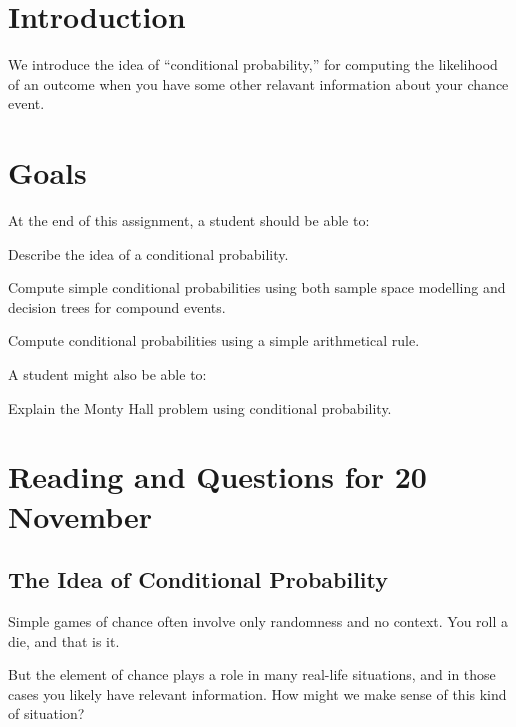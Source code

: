 \documentclass[12pt,letterpaper]{article}
\theoremstyle{definition}
\begin{document}
\setlength{\parskip}{1ex plus 0.5ex minus 0.2ex}
\setlength{\parindent}{0pt}

\pagestyle{fancy}
\cfoot{}

\section*{Introduction}
We introduce the idea of ``conditional probability,'' for computing the likelihood of an outcome when you have some other relavant information about your chance event.

\section*{Goals}
At the end of this assignment, a student should be able to:
\begin{compactitem}
\item Describe the idea of a conditional probability.
\item Compute simple conditional probabilities using both sample space modelling and decision trees for compound events.
\item Compute conditional probabilities using a simple arithmetical rule.
\end{compactitem}
A student might also be able to:
\begin{compactitem}
\item Explain the Monty Hall problem using conditional probability.
\end{compactitem}

\section*{Reading and Questions for 20 November}

\subsection*{The Idea of Conditional Probability}

Simple games of chance often involve only randomness and no context.
You roll a die, and that is it.

But the element of chance plays a role in many real-life situations, and in those cases you likely have relevant information.
How might we make sense of this kind of situation?
\end{document}
